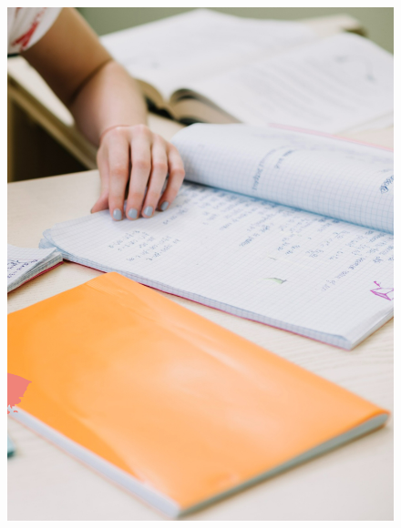 \pagebreak
\begin{figure}[htpb]
\vspace*{-2.5cm}
\hspace{-3cm}\includegraphics[height=\paperheight]{../separadores/separadorMAT9B.png}
\end{figure}



 \blankpage

